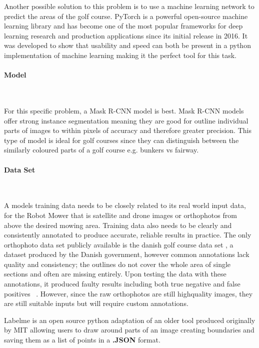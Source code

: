 \documentclass[final]{cmpreport_02}
\begin{document}
Another possible solution to this problem is to use a machine learning network to predict the areas of the golf course.
PyTorch \citep{pytorch} is a powerful open-source machine learning library and has become one of the most popular frameworks for deep learning research and production applications since its initial release in 2016.
It was developed to show that usability and speed can both be present in a python implementation of machine learning making it the perfect tool for this task.

\paragraph{Model} \

For this specific problem, a Mask R-CNN model is best.
Mask R-CNN models offer strong instance segmentation meaning they are good for outline individual parts of images to within pixels of accuracy and therefore greater precision.
This type of model is ideal for golf courses since they can distinguish between the similarly coloured parts of a golf course e.g. bunkers vs fairway.

\paragraph{Data Set} \

A models training data needs to be closely related to its real world input data, for the Robot Mower that is satellite and drone images or orthophotos from above the desired mowing area.
Training data also needs to be clearly and consistently annotated to produce accurate, reliable results in practice.
The only orthophoto data set publicly available is the danish golf course data set \citep{danishgolf}, a dataset produced by the Danish government, however common annotations lack quality and consistency; the outlines do not cover the whole area of single sections and often are missing entirely.
Upon testing the data with these annotations, it produced faulty results including both true negative and false positives ~.
However, since the raw orthophotos are still highquality images, they are still suitable inputs but will require custom annotations.

Labelme \citep{labelme} is an open source python adaptation of an older tool produced originally by MIT allowing users to draw around parts of an image creating boundaries and saving them as a list of points in a \textbf{.JSON} format.
\end{document}
